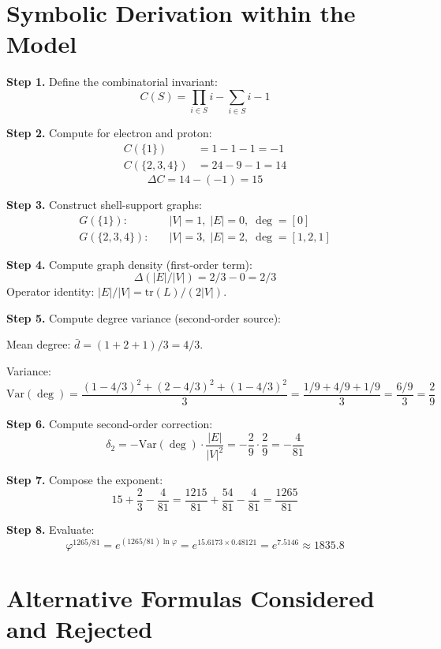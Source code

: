 \documentclass[12pt]{article}
\newcommand{\phig}{\varphi}
\begin{document}
\appendix
\section{Symbolic Derivation within the Model}\label{app:derivation}

\noindent\textbf{Step 1.} Define the combinatorial invariant:
\[
C(S) = \prod_{i \in S} i - \sum_{i \in S} i - 1
\]

\noindent\textbf{Step 2.} Compute for electron and proton:
\begin{align}
C(\{1\}) &= 1 - 1 - 1 = -1 \\
C(\{2,3,4\}) &= 24 - 9 - 1 = 14
\end{align}
\[
\Delta C = 14 - (-1) = 15
\]

\noindent\textbf{Step 3.} Construct shell-support graphs:
\begin{align}
G(\{1\}): &\quad |V| = 1, \; |E| = 0, \; \deg = [0] \\
G(\{2,3,4\}): &\quad |V| = 3, \; |E| = 2, \; \deg = [1,2,1]
\end{align}

\noindent\textbf{Step 4.} Compute graph density (first-order term):
\[
\Delta(|E|/|V|) = 2/3 - 0 = 2/3
\]
Operator identity: $|E|/|V| = \mathrm{tr}(L)/(2|V|)$.

\noindent\textbf{Step 5.} Compute degree variance (second-order source):

Mean degree: $\bar{d} = (1+2+1)/3 = 4/3$.

Variance:
\[
\mathrm{Var}(\deg) = \frac{(1{-}4/3)^2 + (2{-}4/3)^2 + (1{-}4/3)^2}{3} = \frac{1/9 + 4/9 + 1/9}{3} = \frac{6/9}{3} = \frac{2}{9}
\]

\noindent\textbf{Step 6.} Compute second-order correction:
\[
\delta_2 = -\mathrm{Var}(\deg) \cdot \frac{|E|}{|V|^2} = -\frac{2}{9} \cdot \frac{2}{9} = -\frac{4}{81}
\]

\noindent\textbf{Step 7.} Compose the exponent:
\[
15 + \frac{2}{3} - \frac{4}{81} = \frac{1215}{81} + \frac{54}{81} - \frac{4}{81} = \frac{1265}{81}
\]

\noindent\textbf{Step 8.} Evaluate:
\[
\phig^{1265/81} = e^{(1265/81) \ln \phig} = e^{15.6173 \times 0.48121} = e^{7.5146} \approx 1835.8
\]

\section{Alternative Formulas Considered and Rejected}\label{app:rejected}
\end{document}
